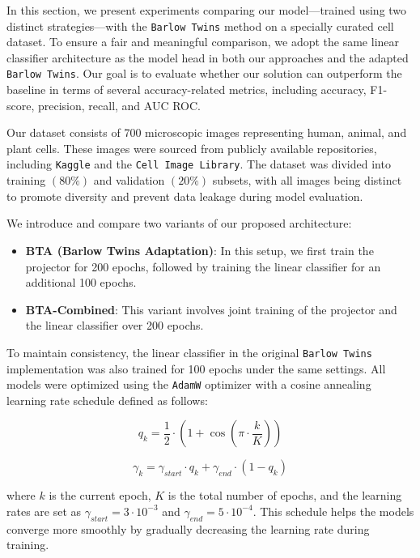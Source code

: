 \documentclass{article}
\begin{document}
In this section, we present experiments comparing our model—trained using two distinct strategies—with the \texttt{Barlow Twins} method on a specially curated cell dataset. To ensure a fair and meaningful comparison, we adopt the same linear classifier architecture as the model head in both our approaches and the adapted \texttt{Barlow Twins}. Our goal is to evaluate whether our solution can outperform the baseline in terms of several accuracy-related metrics, including accuracy, F1-score, precision, recall, and AUC ROC.

Our dataset consists of 700 microscopic images representing human, animal, and plant cells. These images were sourced from publicly available repositories, including \texttt{Kaggle} and the \texttt{Cell Image Library}. The dataset was divided into training $(80\%)$ and validation $(20\%)$ subsets, with all images being distinct to promote diversity and prevent data leakage during model evaluation.

We introduce and compare two variants of our proposed architecture:

\begin{itemize}
\item \textbf{BTA (Barlow Twins Adaptation)}: In this setup, we first train the projector for 200 epochs, followed by training the linear classifier for an additional 100 epochs.
\item \textbf{BTA-Combined}: This variant involves joint training of the projector and the linear classifier over 200 epochs.
\end{itemize}

To maintain consistency, the linear classifier in the original \texttt{Barlow Twins} implementation was also trained for 100 epochs under the same settings. All models were optimized using the \texttt{AdamW} optimizer with a cosine annealing learning rate schedule defined as follows:

$$ q_k = \frac{1}{2} \cdot (1 + \cos(\pi \cdot \frac{k}{K})) $$

$$ \gamma_{k} = \gamma_{start} \cdot q_k + \gamma_{end} \cdot (1 - q_k) $$

where $k$ is the current epoch, $K$ is the total number of epochs, and the learning rates are set as $\gamma_{start} = 3 \cdot 10^{-3}$ and $\gamma_{end} = 5 \cdot 10^{-4}$. This schedule helps the models converge more smoothly by gradually decreasing the learning rate during training.
\end{document}
